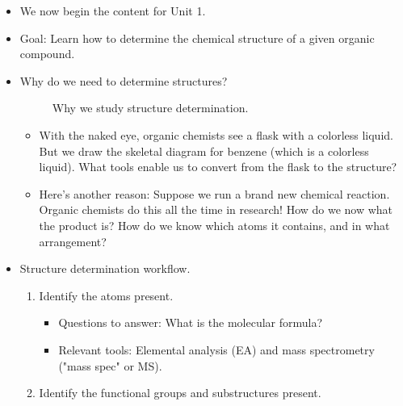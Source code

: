 \documentclass[../notes.tex]{subfiles}
\begin{document}
\begin{itemize}
    \item We now begin the content for Unit 1.
    \item Goal: Learn how to determine the chemical structure of a given organic compound.
    \item Why do we need to determine structures?
    \begin{figure}[h!]
        \centering
        \caption{Why we study structure determination.}
        \label{fig:structureDeterminationRationale}
    \end{figure}
    \begin{itemize}
        \item With the naked eye, organic chemists see a flask with a colorless liquid. But we draw the skeletal diagram for benzene (which is a colorless liquid). What tools enable us to convert from the flask to the structure?
        \item Here's another reason: Suppose we run a brand new chemical reaction. Organic chemists do this all the time in research! How do we now what the product is? How do we know which atoms it contains, and in what arrangement?
    \end{itemize}
    \item Structure determination workflow.
    \begin{enumerate}
        \item Identify the atoms present.
        \begin{itemize}
            \item Questions to answer: What is the molecular formula?
            \item Relevant tools: Elemental analysis (EA) and mass spectrometry ("mass spec" or MS).
        \end{itemize}
        \item Identify the functional groups and substructures present.

\end{enumerate}
\end{itemize}
\end{document}
